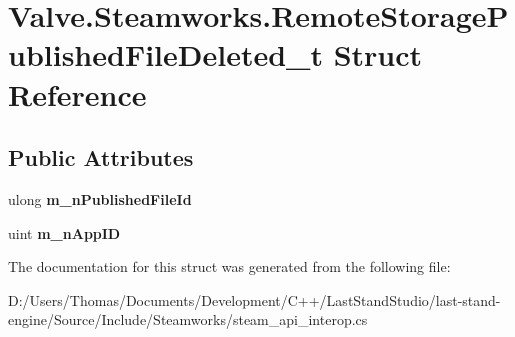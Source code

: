 \hypertarget{structValve_1_1Steamworks_1_1RemoteStoragePublishedFileDeleted__t}{}\section{Valve.\+Steamworks.\+Remote\+Storage\+Published\+File\+Deleted\+\_\+t Struct Reference}
\label{structValve_1_1Steamworks_1_1RemoteStoragePublishedFileDeleted__t}
\subsection*{Public Attributes}
\begin{DoxyCompactItemize}
\item 
\hypertarget{structValve_1_1Steamworks_1_1RemoteStoragePublishedFileDeleted__t_ae0e955a5fd8961666fecdb9a1e9a31f9}{}ulong {\bfseries m\+\_\+n\+Published\+File\+Id}\label{structValve_1_1Steamworks_1_1RemoteStoragePublishedFileDeleted__t_ae0e955a5fd8961666fecdb9a1e9a31f9}

\item 
\hypertarget{structValve_1_1Steamworks_1_1RemoteStoragePublishedFileDeleted__t_a4fe91fcc2daa7d7a10fc5a3e9e4fcfb2}{}uint {\bfseries m\+\_\+n\+App\+I\+D}\label{structValve_1_1Steamworks_1_1RemoteStoragePublishedFileDeleted__t_a4fe91fcc2daa7d7a10fc5a3e9e4fcfb2}

\end{DoxyCompactItemize}


The documentation for this struct was generated from the following file\+:\begin{DoxyCompactItemize}
\item 
D\+:/\+Users/\+Thomas/\+Documents/\+Development/\+C++/\+Last\+Stand\+Studio/last-\/stand-\/engine/\+Source/\+Include/\+Steamworks/steam\+\_\+api\+\_\+interop.\+cs\end{DoxyCompactItemize}
